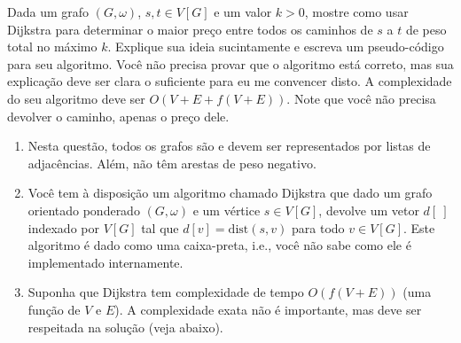 Dada um grafo $(G, \omega)$, $s, t \in V[G]$ e um valor $k > 0$, mostre como usar Dijkstra para determinar o maior preço entre todos os caminhos de $s$ a $t$ de peso total no máximo $k$. Explique sua ideia sucintamente e escreva um pseudo-código para seu algoritmo. Você não  precisa provar que o algoritmo está correto, mas sua explicação deve ser clara o suficiente para eu me convencer disto. A complexidade do seu algoritmo deve ser $O(V+E + f(V+E))$. Note que você não precisa devolver o caminho, apenas o preço dele.

\begin{enumerate}[label={(\alph*)}]
    \item Nesta questão, todos os grafos são e devem ser representados por listas de adjacências. Além, não têm arestas de peso negativo.

    \item Você tem à disposição um algoritmo chamado Dijkstra que dado um grafo orientado ponderado $(G, \omega)$ e um vértice $s \in V[G]$, devolve um vetor $d[~]$ indexado por $V[G]$ tal que $d[v] = \mathrm{dist}(s, v)$ para todo $v \in V[G]$. Este algoritmo é dado como uma caixa-preta, i.e., você não sabe como ele é implementado internamente.

    \item Suponha que Dijkstra tem complexidade de tempo $O(f(V+E))$ (uma função de $V$ e $E$). A complexidade exata não é importante, mas deve ser respeitada na solução (veja abaixo).
\end{enumerate}

\itemdsep

